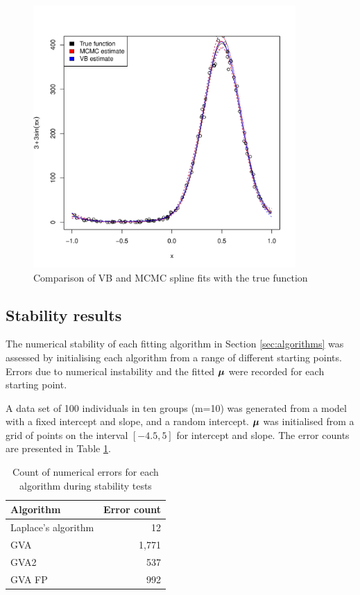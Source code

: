 \documentclass{article}[12pt]
\begin{document}
\begin{figure}
\label{fig:spline}
\caption{Comparison of VB and MCMC spline fits with the true function}
\includegraphics[width=100mm, height=100mm]{code/results/accuracy_plots_spline_gva2.pdf}
\end{figure}


\subsection{Stability results}

The numerical stability of each fitting algorithm in Section \ref{sec:algorithms} was assessed by
initialising each algorithm from a range of different starting points. Errors due to numerical instability and 
the fitted ${\boldsymbol \mu}$ were recorded for each starting point.

A data set of 100 individuals in ten groups (m=10) was generated from a model with a fixed intercept and slope, 
and a random intercept. ${\boldsymbol \mu}$ was initialised from a grid of points on the interval $[-4.5, 5]$ for intercept 
and slope. The error counts are presented in Table \ref{tab:stability_results}.

\begin{table}
\caption{Count of numerical errors for each algorithm during stability tests}
\label{tab:stability_results}
\begin{tabular}{|l|r|}
\hline
Algorithm & Error count \\
\hline
Laplace's algorithm & 12 \\
GVA & 1,771 \\
GVA2 & 537 \\
GVA FP & 992 \\
\hline
\end{tabular}
\end{table}
\end{document}
